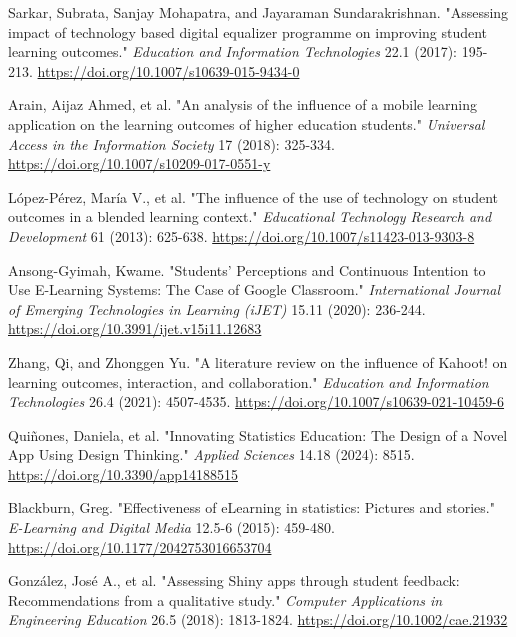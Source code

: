\documentclass[conference,a4paper]{IEEEtran}
\begin{document}
\begin{thebibliography}{00}
   Sarkar, Subrata, Sanjay Mohapatra, and Jayaraman Sundarakrishnan. "Assessing impact of technology based digital equalizer programme on improving student learning outcomes." \textit{Education and Information Technologies} 22.1 (2017): 195-213. \href{https://doi.org/10.1007/s10639-015-9434-0}{https://doi.org/10.1007/s10639-015-9434-0}

   Arain, Aijaz Ahmed, et al. "An analysis of the influence of a mobile learning application on the learning outcomes of higher education students." \textit{Universal Access in the Information Society} 17 (2018): 325-334. \href{https://doi.org/10.1007/s10209-017-0551-y}{https://doi.org/10.1007/s10209-017-0551-y}

   López-Pérez, María V., et al. "The influence of the use of technology on student outcomes in a blended learning context." \textit{Educational Technology Research and Development} 61 (2013): 625-638. \href{https://doi.org/10.1007/s11423-013-9303-8}{https://doi.org/10.1007/s11423-013-9303-8}

   Ansong-Gyimah, Kwame. "Students’ Perceptions and Continuous Intention to Use E-Learning Systems: The Case of Google Classroom." \textit{International Journal of Emerging Technologies in Learning (iJET)} 15.11 (2020): 236-244. \href{https://doi.org/10.3991/ijet.v15i11.12683}{https://doi.org/10.3991/ijet.v15i11.12683}

   Zhang, Qi, and Zhonggen Yu. "A literature review on the influence of Kahoot! on learning outcomes, interaction, and collaboration." \textit{Education and Information Technologies} 26.4 (2021): 4507-4535. \href{https://doi.org/10.1007/s10639-021-10459-6}{https://doi.org/10.1007/s10639-021-10459-6}

   Quiñones, Daniela, et al. "Innovating Statistics Education: The Design of a Novel App Using Design Thinking." \textit{Applied Sciences} 14.18 (2024): 8515. \href{https://doi.org/10.3390/app14188515}{https://doi.org/10.3390/app14188515}

   Blackburn, Greg. "Effectiveness of eLearning in statistics: Pictures and stories." \textit{E-Learning and Digital Media} 12.5-6 (2015): 459-480. \href{https://doi.org/10.1177/2042753016653704}{https://doi.org/10.1177/2042753016653704}

   González, José A., et al. "Assessing Shiny apps through student feedback: Recommendations from a qualitative study." \textit{Computer Applications in Engineering Education} 26.5 (2018): 1813-1824. \href{https://doi.org/10.1002/cae.21932}{https://doi.org/10.1002/cae.21932}


\end{thebibliography}
\end{document}
